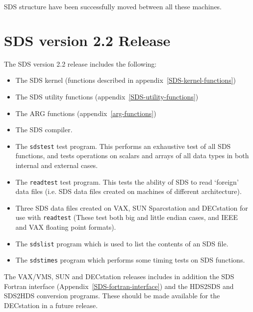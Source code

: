 SDS structure have been successfully moved between all these machines.

\section{SDS version 2.2 Release}

The SDS version 2.2 release includes the following:

\begin{itemize}

\item The SDS kernel (functions described in
appendix~\ref{SDS-kernel-functions})

\item The SDS utility functions (appendix~\ref{SDS-utility-functions})

\item The ARG functions (appendix~\ref{arg-functions})

\item The SDS compiler.

\item The \verb$sdstest$ test program. This performs an exhaustive test of all
SDS functions, and tests operations on scalars and arrays of all data types in
both internal and external cases.

\item The \verb$readtest$ test program. This tests the ability of SDS to read
`foreign' data files (i.e. SDS data files created on machines of different
architecture).

\item Three SDS data files created on VAX, SUN Sparcstation and DECstation for
use with \verb$readtest$ (These test both big and little endian cases, and
IEEE and VAX floating point formats).

\item The \verb$sdslist$ program which is used to list the contents of an SDS
file.

\item The \verb$sdstimes$ program which performs some timing tests on SDS
functions.

\end{itemize}

The VAX/VMS, SUN and DECstation releases includes in addition the SDS Fortran interface
(Appendix~\ref{SDS-fortran-interface}) and the HDS2SDS and SDS2HDS conversion programs. These should be
made available for the DECstation in a future release.


